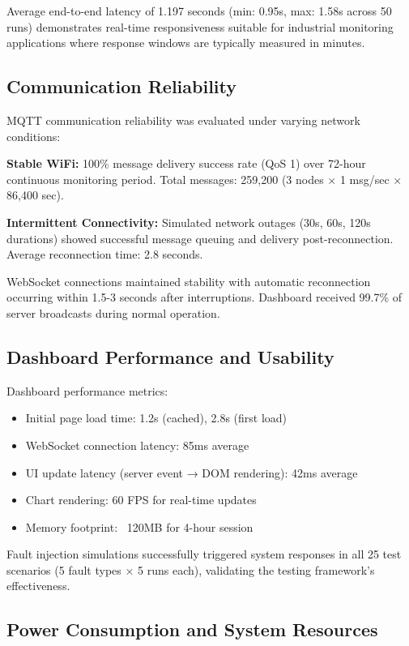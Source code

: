 \documentclass[conference]{IEEEtran}
\begin{document}
Average end-to-end latency of 1.197 seconds (min: 0.95s, max: 1.58s across 50 runs) demonstrates real-time responsiveness suitable for industrial monitoring applications where response windows are typically measured in minutes.

\subsection{Communication Reliability}

MQTT communication reliability was evaluated under varying network conditions:

\textbf{Stable WiFi:} 100\% message delivery success rate (QoS 1) over 72-hour continuous monitoring period. Total messages: 259,200 (3 nodes × 1 msg/sec × 86,400 sec).

\textbf{Intermittent Connectivity:} Simulated network outages (30s, 60s, 120s durations) showed successful message queuing and delivery post-reconnection. Average reconnection time: 2.8 seconds.

WebSocket connections maintained stability with automatic reconnection occurring within 1.5-3 seconds after interruptions. Dashboard received 99.7\% of server broadcasts during normal operation.

\subsection{Dashboard Performance and Usability}

Dashboard performance metrics:
\begin{itemize}
\item Initial page load time: 1.2s (cached), 2.8s (first load)
\item WebSocket connection latency: 85ms average
\item UI update latency (server event → DOM rendering): 42ms average
\item Chart rendering: 60 FPS for real-time updates
\item Memory footprint: ~120MB for 4-hour session
\end{itemize}

Fault injection simulations successfully triggered system responses in all 25 test scenarios (5 fault types × 5 runs each), validating the testing framework's effectiveness.

\subsection{Power Consumption and System Resources}
\end{document}

